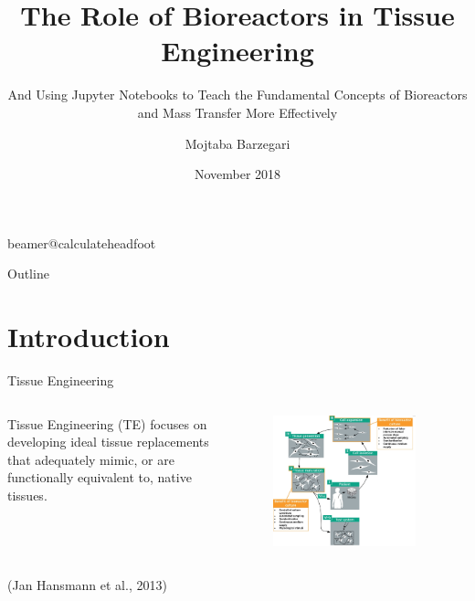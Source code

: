 \documentclass[11pt,t]{beamer}
\title[The Role of Bioreactors in Tissue Engineering]{The Role of Bioreactors in Tissue Engineering} %
\subtitle{And Using Jupyter Notebooks to Teach the Fundamental Concepts of Bioreactors and Mass Transfer More Effectively}
\author{Mojtaba Barzegari}
\institute{Biomechanics Section, Department of Mechanical Engineering}
\date{November 2018}
\begin{document}
\csname beamer@calculateheadfoot\endcsname %

\begin{frame}
	\titlepage
\end{frame}
	

\begin{frame}{Outline}
	\hfill	{\large \parbox{.961\textwidth}{\tableofcontents[hideothersubsections]}}
\end{frame}

\section{Introduction}
\begin{frame}[fragile]{Tissue Engineering}  
	\begin{columns}[t]
		\begin{column}{.5\textwidth}
			Tissue Engineering (TE) focuses on developing ideal tissue replacements that adequately mimic, or are functionally equivalent to, native tissues.
		\end{column}
		\begin{column}{.5\textwidth}
			\vspace{-30pt}
			\begin{figure}
			\centering
			\includegraphics[width=0.9\textwidth]{te_paradigm1}
			\end{figure}
		\end{column}
	\end{columns}	
	
	\footnotesize(Jan Hansmann et al., 2013)

\end{frame}
 
\end{document}
